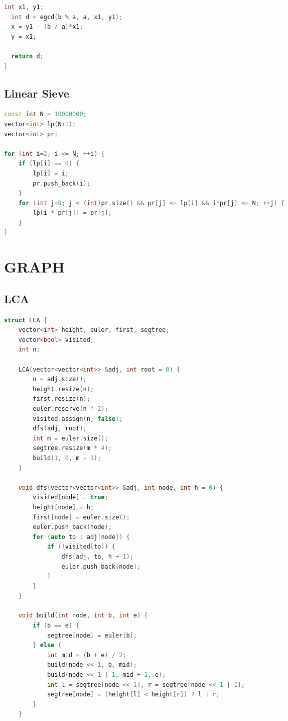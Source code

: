 \documentclass[10pt,a4paper,landscape]{article}
\begin{document}
\begin{multicols}{3}
\begin{lstlisting}[language=C++, breaklines=true]
  int x1, y1;
  int d = egcd(b % a, a, x1, y1);
  x = y1 - (b / a)*x1;
  y = x1;

  return d;
}
\end{lstlisting}

\subsection{Linear Sieve}
\begin{lstlisting}[language=C++, breaklines=true]
const int N = 10000000;
vector<int> lp(N+1);
vector<int> pr;

for (int i=2; i <= N; ++i) {
    if (lp[i] == 0) {
        lp[i] = i;
        pr.push_back(i);
    }
    for (int j=0; j < (int)pr.size() && pr[j] <= lp[i] && i*pr[j] <= N; ++j) {
        lp[i * pr[j]] = pr[j];
    }
}
\end{lstlisting}

\section{GRAPH}
\subsection{LCA}
\begin{lstlisting}[language=C++,breaklines=true]
struct LCA {
    vector<int> height, euler, first, segtree;
    vector<bool> visited;
    int n;

    LCA(vector<vector<int>> &adj, int root = 0) {
        n = adj.size();
        height.resize(n);
        first.resize(n);
        euler.reserve(n * 2);
        visited.assign(n, false);
        dfs(adj, root);
        int m = euler.size();
        segtree.resize(m * 4);
        build(1, 0, m - 1);
    }

    void dfs(vector<vector<int>> &adj, int node, int h = 0) {
        visited[node] = true;
        height[node] = h;
        first[node] = euler.size();
        euler.push_back(node);
        for (auto to : adj[node]) {
            if (!visited[to]) {
                dfs(adj, to, h + 1);
                euler.push_back(node);
            }
        }
    }

    void build(int node, int b, int e) {
        if (b == e) {
            segtree[node] = euler[b];
        } else {
            int mid = (b + e) / 2;
            build(node << 1, b, mid);
            build(node << 1 | 1, mid + 1, e);
            int l = segtree[node << 1], r = segtree[node << 1 | 1];
            segtree[node] = (height[l] < height[r]) ? l : r;
        }
    }


\end{lstlisting}
\end{multicols}
\end{document}

